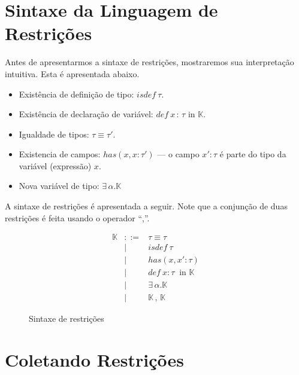 \documentclass[a4paper,8pt]{article}
\begin{document}
     \section{Sintaxe da Linguagem de Restrições}\label{constraintsyn}

     Antes de apresentarmos a sintaxe de restrições, mostraremos sua
     interpretação intuitiva. Esta é apresentada abaixo.

       \begin{itemize}
           \item Existência de definição de tipo: $isdef\:\tau$.
           \item Existência de declaração de variável:
             $def\:x\,:\,\tau \text{ in } \mathbb{K}$.
           \item Igualdade de tipos: $\tau \equiv \tau'$.
	   \item Existencia de campos: $has(x,x:\tau')$ --- o campo $x'
             : \tau$ é parte do tipo da variável (expressão) $x$.
           \item Nova variável de tipo: $\exists \,\alpha. \mathbb{K}$
       \end{itemize}

     A sintaxe de restrições é apresentada a seguir. Note que a
     conjunção de duas restrições é feita usando o operador ``,''.
     \begin{figure}[h]
        \[
             \begin{array}{lcl}
                 \mathbb{K} & ::= & \tau \equiv \tau \\
                                    & \mid & isdef\:\tau \\
                                    & \mid & has(x,x' : \tau) \\
                                    & \mid & def\:x:\tau\:\text{ in
                                             }\mathbb{K}\\
                                    & \mid &
                                             \exists\,\alpha.\mathbb{K}\\
                                    & \mid & \mathbb{K}\,,\,\mathbb{K}
             \end{array}
        \]
        \centering
        \caption{Sintaxe de restrições}
        \label{figconstrsyn}
      \end{figure}
      
     \section{Coletando Restrições}\label{constrcollect}
\end{document}
